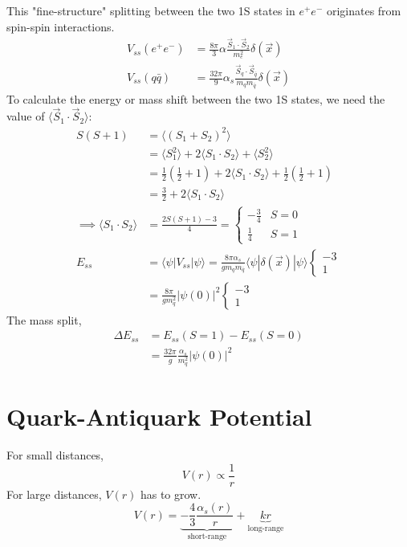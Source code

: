 \documentclass[a4paper, 11pt, normalem]{report}
\begin{document}
This "fine-structure" splitting between the two 1S states in $e^+e^-$ originates from spin-spin interactions.
\begin{align}
    V_{ss}(e^+e^-) &= \frac{8\pi}{3}\alpha\frac{\vec{S}_1\cdot\vec{S}_2}{m_e^2}\delta(\vec{x}) \\
    V_{ss}(q\bar{q}) &= \frac{32\pi}{9}\alpha_s\frac{\vec{S}_q\cdot\vec{S}_{\bar{q}}}{m_qm_{\bar{q}}}\delta(\vec{x})
\end{align}
To calculate the energy or mass shift between the two 1S states, we need the value of $\langle \vec{S}_1\cdot\vec{S}_2\rangle$:
\begin{align}
    S(S+1) &= \langle (S_1 + S_2)^2\rangle \\
           &= \langle S_1^2\rangle + 2\langle S_1\cdot S_2\rangle + \langle S_2^2\rangle \\
           &= \frac12 (\frac12 + 1) + 2\langle S_1\cdot S_2\rangle + \frac12 (\frac12 + 1) \\
           &= \frac32 + 2\langle S_1\cdot S_2\rangle \\
    \implies \langle S_1\cdot S_2\rangle &= \frac{2S(S+1) - 3}{4} = \begin{cases} -\frac34 & S = 0 \\ \frac14 & S = 1 \end{cases} \\
    E_{ss} &= \langle\psi|V_{ss}|\psi\rangle = \frac{8\pi\alpha_s}{gm_qm_{\bar{q}}}\langle\psi|\delta(\vec{x})|\psi\rangle \begin{cases} -3 \\ 1 \end{cases} \\ 
           &= \frac{8\pi}{gm_q^2}|\psi(0)|^2\begin{cases} -3 \\ 1 \end{cases}
\end{align}
The mass split, 
\begin{align}
    \Delta E_{ss} &= E_{ss}(S=1) - E_{ss}(S=0) \\
                  &= \frac{32\pi}{g}\frac{\alpha_s}{m_q^2}|\psi(0)|^2
\end{align}

\section{Quark-Antiquark Potential}
For small distances, 
\begin{equation}
    V(r) \propto \frac{1}{r}
\end{equation}
For large distances, $V(r)$ has to grow. 
\begin{equation}
    V(r) = \underbrace{-\frac43\frac{\alpha_s(r)}{r}}_{\text{short-range}} + \underbrace{kr}_{\text{long-range}}
\end{equation}
\end{document}
